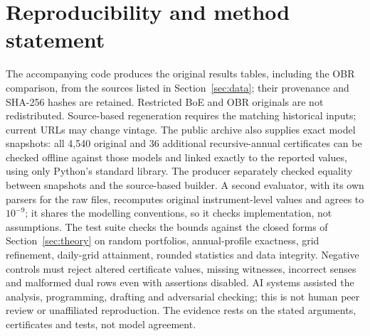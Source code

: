 \documentclass[11pt,a4paper]{article}
\theoremstyle{remark}
\begin{document}
\section*{Reproducibility and method statement}
The accompanying code produces the original results tables, including the OBR comparison, from the sources listed in Section~\ref{sec:data}; their provenance and SHA-256 hashes are retained. Restricted BoE and OBR originals are not redistributed. Source-based regeneration requires the matching historical inputs; current URLs may change vintage. The public archive also supplies exact model snapshots: all 4,540 original and 36 additional recursive-annual certificates can be checked offline against those models and linked exactly to the reported values, using only Python's standard library. The producer separately checked equality between snapshots and the source-based builder. A second evaluator, with its own parsers for the raw files, recomputes original instrument-level values and agrees to $10^{-9}$; it shares the modelling conventions, so it checks implementation, not assumptions. The test suite checks the bounds against the closed forms of Section~\ref{sec:theory} on random portfolios, annual-profile exactness, grid refinement, daily-grid attainment, rounded statistics and data integrity. Negative controls must reject altered certificate values, missing witnesses, incorrect senses and malformed dual rows even with assertions disabled. AI systems assisted the analysis, programming, drafting and adversarial checking; this is not human peer review or unaffiliated reproduction. The evidence rests on the stated arguments, certificates and tests, not model agreement.
\end{document}
